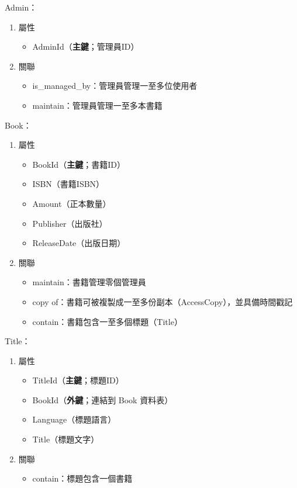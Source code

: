 \hspace*{-2em}Admin：

\begin{enumerate}
\item 屬性
    \begin{itemize}
    \item AdminId（\textbf{主鍵}；管理員ID）
    \end{itemize}
\item 關聯
    \begin{itemize}
    \item is\_managed\_by：管理員管理一至多位使用者
    \item maintain：管理員管理一至多本書籍
    \end{itemize}
\end{enumerate}

\hspace*{-2em}Book：

\begin{enumerate}
\item 屬性
    \begin{itemize}
    \item BookId（\textbf{主鍵}；書籍ID）
    \item ISBN（書籍ISBN）
    \item Amount（正本數量）
    \item Publisher（出版社）
    \item ReleaseDate（出版日期）
    \end{itemize}
\item 關聯
    \begin{itemize}
    \item maintain：書籍管理零個管理員
    \item copy of：書籍可被複製成一至多份副本（AccessCopy），並具備時間戳記
    \item contain：書籍包含一至多個標題（Title）
    \end{itemize}
\end{enumerate}

\hspace*{-2em}Title：

\begin{enumerate}
\item 屬性
    \begin{itemize}
    \item TitleId（\textbf{主鍵}；標題ID）
    \item BookId（\textbf{外鍵}；連結到 Book 資料表）
    \item Language（標題語言）
    \item Title（標題文字）
    \end{itemize}
\item 關聯
    \begin{itemize}
    \item contain：標題包含一個書籍
    \end{itemize}
\end{enumerate}

